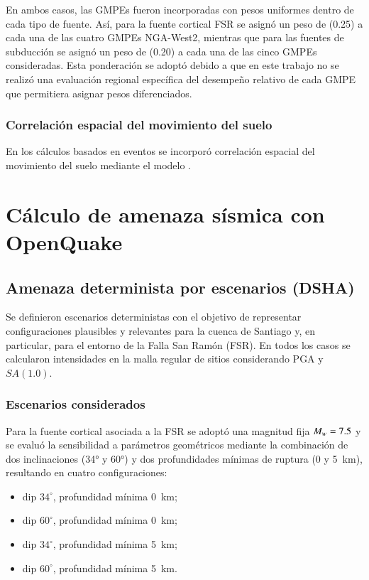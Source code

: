 En ambos casos, las GMPEs fueron incorporadas con pesos uniformes dentro de cada tipo de fuente. Así, para la fuente cortical FSR se asignó un peso de (0.25) a cada una de las cuatro GMPEs NGA-West2, mientras que para las fuentes de subducción se asignó un peso de (0.20) a cada una de las cinco GMPEs consideradas. Esta ponderación se adoptó debido a que en este trabajo no se realizó una evaluación regional específica del desempeño relativo de cada GMPE que permitiera asignar pesos diferenciados.

\subsubsection{Correlación espacial del movimiento del suelo}
\label{sec:meto_correlacion}

En los cálculos basados en eventos se incorporó correlación espacial del movimiento del suelo mediante el modelo .

\section{Cálculo de amenaza sísmica con OpenQuake}
\label{sec:meto_calculo_amenaza}

\subsection{Amenaza determinista por escenarios (DSHA)}
\label{sec:meto_dsha}

Se definieron escenarios deterministas con el objetivo de representar configuraciones plausibles y relevantes para la cuenca de Santiago y, en particular, para el entorno de la Falla San Ramón (FSR). En todos los casos se calcularon intensidades en la malla regular de sitios considerando PGA y $SA(1.0)$.

\subsubsection{Escenarios considerados}
\label{sec:meto_dsha_escenarios}

Para la fuente cortical asociada a la FSR se adoptó una magnitud fija $M_w{}=7.5$ y se evaluó la sensibilidad a parámetros geométricos mediante la combinación de dos inclinaciones (34° y 60°) y dos profundidades mínimas de ruptura (0 y 5~km), resultando en cuatro configuraciones:
\begin{itemize}
    \item dip $34^\circ$, profundidad mínima 0~km;
    \item dip $60^\circ$, profundidad mínima 0~km;
    \item dip $34^\circ$, profundidad mínima 5~km;
    \item dip $60^\circ$, profundidad mínima 5~km.
\end{itemize}

